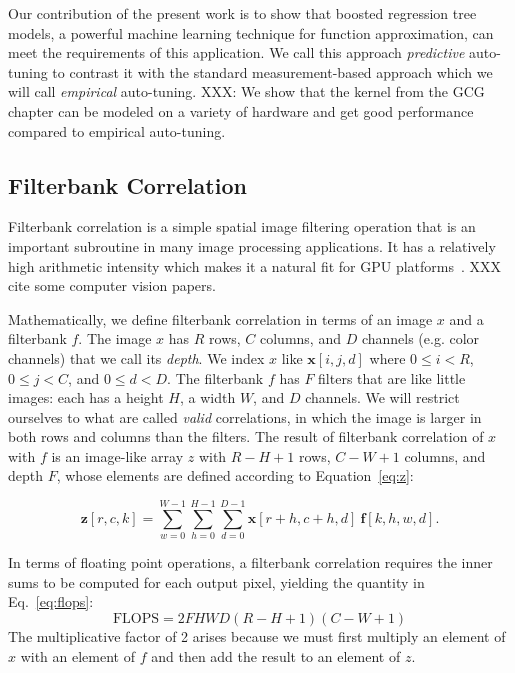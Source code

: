 \documentclass{sig-alternate}
\begin{document}
Our contribution of the present work is to show that boosted regression tree models,
a powerful machine learning technique for function approximation, can meet the
requirements of this application.
We call this approach {\em predictive} auto-tuning to contrast it with the standard measurement-based approach which we will call {\em empirical} auto-tuning.
XXX: We show that the kernel from the GCG chapter can be modeled on a variety of hardware and get good performance compared to empirical auto-tuning.


\cite{volkov+demmel:2008}
\cite{vuduc:2003} %


\subsection{Filterbank Correlation}
\label{sec:fbcorr}

Filterbank correlation is a simple spatial image filtering operation that is
an important subroutine in many image processing applications. It has a relatively
high arithmetic intensity which makes it a natural fit for GPU platforms~\citep{pinto+cox:2011gcg}. XXX cite some computer vision papers.

Mathematically, we define filterbank correlation in terms of an
image $x$ and a filterbank $f$.
The image $x$ has $R$ rows, $C$ columns, and $D$ channels (e.g. color
channels) that we call its {\em depth}. We index $x$ like $\mathbf{x}[i,j,d]$
where $0 \leq i < R$, $0 \leq j < C$, and $0 \leq d < D$.
The filterbank $f$ has $F$ filters that are like little images: each has a
height $H$, a width $W$, and $D$ channels.
We will restrict ourselves to what are called {\em valid} correlations, in
which the image is larger in both rows and columns than the filters.
The result of filterbank correlation of $x$ with $f$ is an image-like array
$z$ with $R-H+1$ rows, $C-W+1$ columns, and depth $F$, whose elements are
defined according to Equation~\ref{eq:z}:

\begin{equation}
    \mathbf{z}[r,c,k] = \sum_{w=0}^{W-1} \sum_{h=0}^{H-1} \sum_{d=0}^{D-1}
        \mathbf{x}[r+h, c+h, d]~ \mathbf{f}[k, h, w, d].
        \label{eq:z}
\end{equation}

In terms of floating point operations, a filterbank correlation requires the
inner sums to be computed for each output pixel, yielding the quantity in
Eq.~\ref{eq:flops}:
\begin{equation}
\mathrm{FLOPS} = 2  F  H  W  D  (R - H + 1)( C- W + 1)
\label{eq:flops}
\end{equation}
The multiplicative factor of 2 arises because we must first multiply an element of
$x$ with an element of $f$ and then add the result to an element of $z$.
\end{document}
